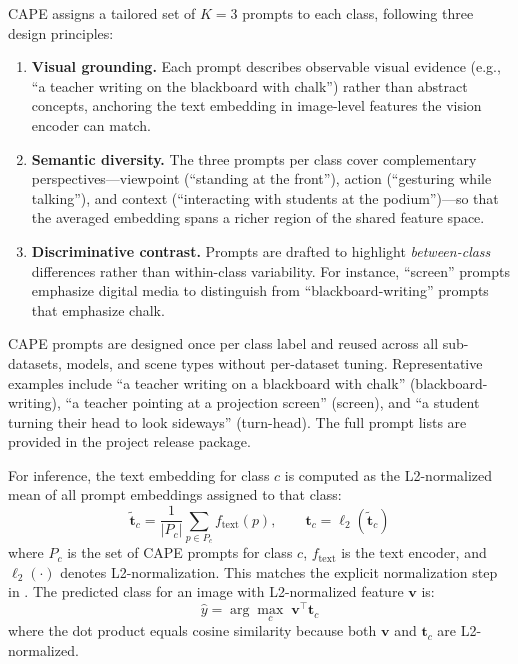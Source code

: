 \documentclass[symmetry,article,submit,pdftex,moreauthors]{Definitions/mdpi}
\begin{document}
CAPE assigns a tailored set of $K=3$ prompts to each class, following three design principles:
\begin{enumerate}
    \item \textbf{Visual grounding.} Each prompt describes observable visual evidence (e.g., ``a teacher writing on the blackboard with chalk'') rather than abstract concepts, anchoring the text embedding in image-level features the vision encoder can match.
    \item \textbf{Semantic diversity.} The three prompts per class cover complementary perspectives---viewpoint (``standing at the front''), action (``gesturing while talking''), and context (``interacting with students at the podium'')---so that the averaged embedding spans a richer region of the shared feature space.
    \item \textbf{Discriminative contrast.} Prompts are drafted to highlight \emph{between-class} differences rather than within-class variability. For instance, ``screen'' prompts emphasize digital media to distinguish from ``blackboard-writing'' prompts that emphasize chalk.
\end{enumerate}
CAPE prompts are designed once per class label and reused across all sub-datasets, models, and scene types without per-dataset tuning.
Representative examples include ``a teacher writing on a blackboard with chalk'' (blackboard-writing), ``a teacher pointing at a projection screen'' (screen), and ``a student turning their head to look sideways'' (turn-head). The full prompt lists are provided in the project release package.

For inference, the text embedding for class $c$ is computed as the L2-normalized mean of all prompt embeddings assigned to that class:
\begin{equation}
\tilde{\mathbf{t}}_c = \frac{1}{|P_c|} \sum_{p \in P_c} f_{\text{text}}(p), \qquad \mathbf{t}_c = \ell_2(\tilde{\mathbf{t}}_c)
\end{equation}
where $P_c$ is the set of CAPE prompts for class $c$, $f_{\text{text}}$ is the text encoder, and $\ell_2(\cdot)$ denotes L2-normalization. This matches the explicit normalization step in .
The predicted class for an image with L2-normalized feature $\mathbf{v}$ is:
\begin{equation}
\hat{y} = \arg\max_{c} \; \mathbf{v}^{\!\top} \mathbf{t}_c
\end{equation}
where the dot product equals cosine similarity because both $\mathbf{v}$ and $\mathbf{t}_c$ are L2-normalized.
\end{document}
